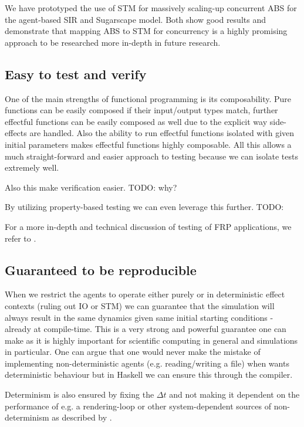 We have prototyped the use of STM for massively scaling-up concurrent ABS for the agent-based SIR \cite{macal_agent-based_2010} and Sugarscape \cite{epstein_growing_1996} model. Both show good results and demonstrate that mapping ABS to STM for concurrency is a highly promising approach to be researched more in-depth in future research.

\subsection{Easy to test and verify}
One of the main strengths of functional programming is its composability. Pure functions can be easily composed if their input/output types match, further effectful functions can be easily composed as well due to the explicit way side-effects are handled. Also the ability to run effectful functions isolated with given initial parameters makes effectful functions highly composable. All this allows a much straight-forward and easier approach to testing because we can isolate tests extremely well.

Also this make verification easier. TODO: why?

By utilizing property-based testing we can even leverage this further. TODO:

For a more in-depth and technical discussion of testing of FRP applications, we refer to \cite{perez_testing_2017, perez_back_2017}.

\subsection{Guaranteed to be reproducible}
When we restrict the agents to operate either purely or in deterministic effect contexts (ruling out IO or STM) we can guarantee that the simulation will always result in the same dynamics given same initial starting conditions - already at compile-time. This is a very strong and powerful guarantee  one can make as it is highly important for scientific computing in general and simulations in particular. One can argue that one would never make the mistake of implementing non-deterministic agents (e.g. reading/writing a file) when wants deterministic behaviour but in Haskell we can ensure this through the compiler.

Determinism is also ensured by fixing the $\Delta t$ and not making it dependent on the performance of e.g. a rendering-loop or other system-dependent sources of non-determinism as described by \cite{perez_testing_2017}.

